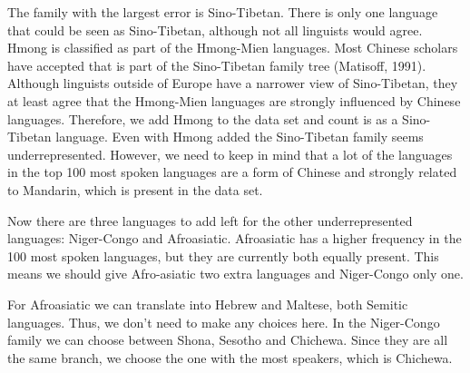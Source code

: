 The family with the largest error is Sino-Tibetan. There is only one language that could be seen as Sino-Tibetan, although not all linguists would agree. Hmong is classified as part of the Hmong-Mien languages. Most Chinese scholars have accepted that is part of the Sino-Tibetan family tree (Matisoff, 1991). Although linguists outside of Europe have a narrower view of Sino-Tibetan, they at least agree that the Hmong-Mien languages are strongly influenced by Chinese languages. Therefore, we add Hmong to the data set and count is as a Sino-Tibetan language. Even with Hmong added the Sino-Tibetan family seems underrepresented. However, we need to keep in mind that a lot of the languages in the top 100 most spoken languages are a form of Chinese and strongly related to Mandarin, which is present in the data set. 

Now there are three languages to add left for the other underrepresented languages: Niger-Congo and Afroasiatic. Afroasiatic has a higher frequency in the 100 most spoken languages, but they are currently both equally present. This means we should give Afro-asiatic two extra languages and Niger-Congo only one.  

For Afroasiatic we can translate into Hebrew and Maltese, both Semitic languages. Thus, we don’t need to make any choices here. In the Niger-Congo family we can choose between Shona, Sesotho and Chichewa. Since they are all the same branch, we choose the one with the most speakers, which is Chichewa.   



